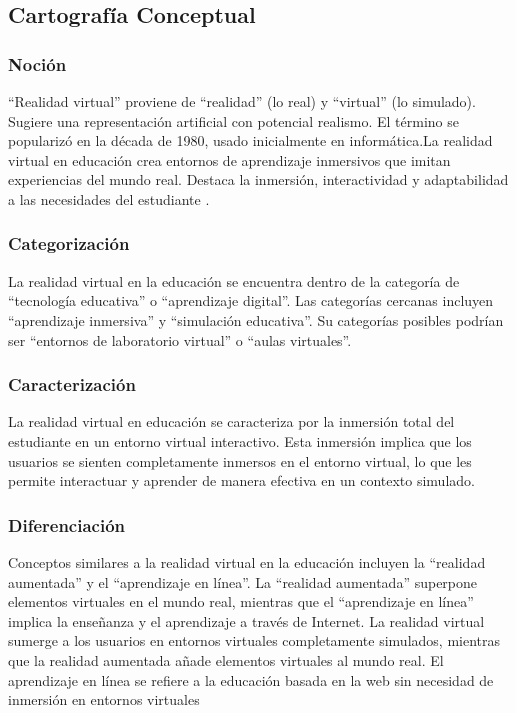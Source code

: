 \subsection{Cartografía Conceptual}

\subsubsection{Noción}

“Realidad virtual” proviene de “realidad” (lo real) y “virtual” (lo simulado). Sugiere una representación artificial con potencial realismo. El término se popularizó en la década de 1980, usado inicialmente en informática.La realidad virtual en educación crea entornos de aprendizaje inmersivos que imitan experiencias del mundo real. Destaca la inmersión, interactividad y adaptabilidad a las necesidades del estudiante \parencite{zheng1998virtual}.

\subsubsection{Categorización}

La realidad virtual en la educación se encuentra dentro de la categoría de “tecnología educativa” o “aprendizaje digital”. Las categorías cercanas incluyen “aprendizaje inmersiva” y “simulación educativa”. Su categorías posibles podrían ser “entornos de laboratorio virtual” o “aulas virtuales”. \parencite{barahona2019cospaces, marin2022realidad}

\subsubsection{Caracterización}

La realidad virtual en educación se caracteriza por la inmersión total del estudiante en un entorno virtual interactivo. Esta inmersión implica que los usuarios se sienten completamente inmersos en el entorno virtual, lo que les permite interactuar y aprender de manera efectiva en un contexto simulado. \parencite{zamudio2021realidad}



\subsubsection{Diferenciación}

Conceptos similares a la realidad virtual en la educación incluyen la “realidad aumentada” y el “aprendizaje en línea”. La “realidad aumentada” superpone elementos virtuales en el mundo real, mientras que el “aprendizaje en línea” implica la enseñanza y el aprendizaje a través de Internet. La realidad virtual sumerge a los usuarios en entornos virtuales completamente simulados, mientras que la realidad aumentada añade elementos virtuales al mundo real. El aprendizaje en línea se refiere a la educación basada en la web sin necesidad de inmersión en entornos virtuales \parencite{garcia2020}

